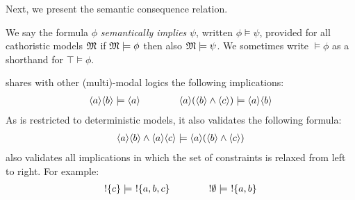
\NI Next, we present the semantic consequence relation.
\begin{definition} 
 We say the formula $\phi$ \emph{semantically implies} $\psi$, written $\phi
   \models \psi$, provided for all cathoristic models $\frak{M}$ if $\frak{M} \models \phi$ then also $\frak{M} \models \psi$.
   We sometimes write $\models \phi$ as a shorthand for $\top \models \phi$.
\end{definition}

\NI \Cathoristic{} shares with other (multi)-modal logics the following
implications:
\begin{eqnarray*}
\langle a \rangle \langle b \rangle \models \langle a \rangle \qquad\qquad
\langle a \rangle (\langle b \rangle \land \langle c \rangle ) \models \langle a \rangle \langle b \rangle \end{eqnarray*}
As \cathoristic{} is restricted to deterministic models, it also
validates the following formula:
\begin{eqnarray*}
\langle a \rangle \langle b \rangle \land \langle a \rangle \langle c \rangle \models \langle a \rangle (\langle b \rangle \land \langle c \rangle )
\end{eqnarray*}
\Cathoristic{} also validates all implications in which the set of constraints is relaxed from left to right. For example:
\begin{eqnarray*}
! \{c\} \models\ ! \{a, b, c\} 
 \qquad\qquad
! \emptyset \models\ ! \{a, b\} 
\end{eqnarray*}

